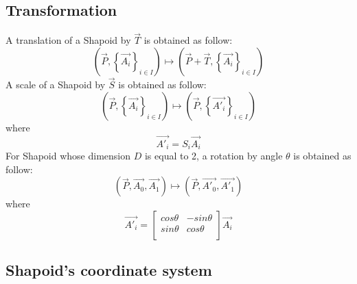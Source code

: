 \documentclass[12pt, a4paper]{article}
\begin{document}
\subsection{Transformation}

A translation of a Shapoid by $\overrightarrow{T}$ is obtained as follow:\\
\begin{equation}
\left(\overrightarrow{P},\left\lbrace\overrightarrow{A_i}\right\rbrace_{i\in I}\right)\mapsto\left(\overrightarrow{P}+\overrightarrow{T},\left\lbrace\overrightarrow{A_i}\right\rbrace_{i\in I}\right)
\end{equation} 
A scale of a Shapoid by $\overrightarrow{S}$ is obtained as follow:\\
\begin{equation}
\left(\overrightarrow{P},\left\lbrace\overrightarrow{A_i}\right\rbrace_{i\in I}\right)\mapsto\left( \overrightarrow{P},\left\lbrace\overrightarrow{A'_i}\right\rbrace_{i\in I}\right)
\end{equation} 
where
\begin{equation}
\overrightarrow{A'_i}=S_i\overrightarrow{A_i}
\end{equation}
For Shapoid whose dimension $D$ is equal to 2, a rotation by angle $\theta$ is obtained as follow:\\
\begin{equation}
\left(\overrightarrow{P},\overrightarrow{A_0},\overrightarrow{A_1}\right)\mapsto\left(\overrightarrow{P},\overrightarrow{A'_0},\overrightarrow{A'_1}\right)
\end{equation} 
where
\begin{equation}
\overrightarrow{A'_i}=\left[
\begin{array}{cc}
cos\theta&-sin\theta\\
sin\theta&cos\theta\\
\end{array}
\right]
\overrightarrow{A_i}
\end{equation}

\subsection{Shapoid's coordinate system}
\end{document}
